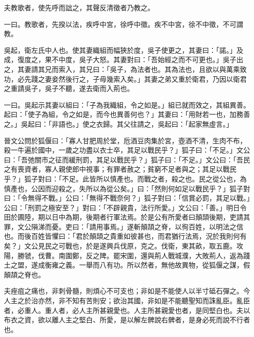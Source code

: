 \begin{pinyinscope}
夫教歌者，使先呼而詘之，其聲反清徵者乃教之。

一曰。教歌者，先揆以法，疾呼中宮，徐呼中徵。疾不中宮，徐不中徵，不可謂教。

吳起，衛左氏中人也。使其妻織組而幅狹於度，吳子使更之，其妻曰：「諾。」及成，復度之，果不中度，吳子大怒。其妻對曰：「吾始經之而不可更也。」吳子出之，其妻請其兄而索入，其兄曰：「吳子，為法者也。其為法也，且欲以與萬乘致功，必先踐之妻妾然後行之，子毋幾索入矣。」其妻之弟又重於衛君，乃因以衛君之重請吳子，吳子不聽，遂去衛而入荊也。

一曰。吳起示其妻以組曰：「子為我織組，令之如是。」組已就而效之，其組異善。起曰：「使子為組，令之如是，而今也異善何也？」其妻曰：「用財若一也，加務善之。」吳起曰：「非語也。」使之衣歸。其父往請之，吳起曰：「起家無虛言。」

晉文公問於狐偃曰：「寡人甘肥周於堂，卮酒豆肉集於宮，壺酒不清，生肉不布，殺一牛遍於國中，一歲之功盡以衣士卒，其足以戰民乎？」狐子曰：「不足。」文公曰：「吾弛關市之征而緩刑罰，其足以戰民乎？」狐子曰：「不足。」文公曰：「吾民之有喪資者，寡人親使郎中視事；有罪者赦之；貧窮不足者與之；其足以戰民乎？」狐子對曰：「不足。此皆所以慎產也。而戰之者，殺之也。民之從公也，為慎產也，公因而迎殺之，失所以為從公矣。」曰：「然則何如足以戰民乎？」狐子對曰：「令無得不戰。」公曰：「無得不戰奈何？」狐子對曰：「信賞必罰，其足以戰。」公曰：「刑罰之極安至？」對曰：「不辟親貴，法行所愛。」文公曰：「善。」明日令田於圃陸，期以日中為期，後期者行軍法焉。於是公有所愛者曰顛頡後期，吏請其罪，文公隕涕而憂。吏曰：「請用事焉。」遂斬顛頡之脊，以徇百姓，以明法之信也。而後百姓皆懼曰：「君於顛頡之貴重如彼甚也，而君猶行法焉，況於我則何有矣？」文公見民之可戰也，於是遂興兵伐原，克之。伐衛，東其畝，取五鹿。攻陽，勝虢，伐曹。南圍鄭，反之陴。罷宋圍，還與荊人戰城濮，大敗荊人，返為踐土之盟，遂成衡雍之義。一舉而八有功。所以然者，無他故異物，從狐偃之謀，假顛頡之脊也。

夫痤疽之痛也，非刺骨髓，則煩心不可支也；非如是不能使人以半寸砥石彈之。今人主之於治亦然，非不知有苦則安；欲治其國，非如是不能聽聖知而誅亂臣。亂臣者，必重人。重人者，必人主所甚親愛也。人主所甚親愛也者，是同堅白也。夫以布衣之資，欲以離人主之堅白、所愛，是以解左髀說右髀者，是身必死而說不行者也。


\end{pinyinscope}